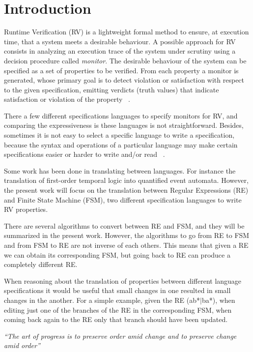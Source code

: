 \section{Introduction}
Runtime Verification (RV) is a lightweight formal method to ensure, at execution time, that a system meets a desirable behaviour. A possible approach for RV consists in analyzing an execution trace of the system under scrutiny using a decision procedure called \textit{monitor}. The desirable behaviour of the system can be specified as a set of properties to be verified. From each property a monitor is generated, whose primary goal is to detect violation or satisfaction with respect to the given specification, emitting verdicts (truth values) that indicate satisfaction or violation of the property ~\cite{rv2,rv3,rvart}.  

There a few different specifications languages to specify monitors for RV, and comparing the expressiveness is these languages is not straightforward. Besides, sometimes it is not easy to select a specific language to write a specification, because the syntax and operations of a particular language may make certain specifications easier or harder to write and/or read ~\cite{rv2,rvart}. 

Some work has been done in translating between languages. For instance the translation of first-order temporal logic into quantified event automata. However, the present work will focus on the translation between Regular Expressions (RE) and Finite State Machine (FSM), two different specification languages to write RV properties.

There are several algorithms to convert between RE and FSM, and they will be summarized in the present work. However, the algorithms to go from RE to FSM and  from FSM to RE are not inverse of each others. This means that given a RE we can obtain its corresponding FSM, but going back to RE can produce a completely different RE. 

When reasoning about the translation of properties between different language specifications it would be useful that small changes in one resulted in small changes in the another. For a simple example, given the RE (ab*$|$ba*), when editing just one of the branches of the RE in the corresponding FSM, when coming back again to the RE only that branch should have been updated. 

\begin{center}
    \textit{``The art of progress is to preserve order amid change and to preserve change amid order''}
\end{center}

